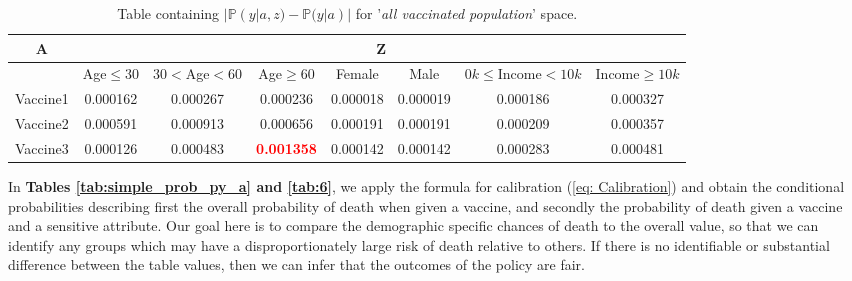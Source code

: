 \documentclass{article}
\begin{document}
\begin{center}
\begin{table}[H]
\begin{adjustbox}{max width=\textwidth}
    \begin{tabular}{ |c| c c c c c c c|}
        \hline
          A  & \multicolumn{7}{c|}{Z} \\
          \hline
          & Age$\leq30$ &    $30<$Age$<60$ &     Age$\geq60$ &    Female &      Male &   $0k\leq$Income$<10k$ &    Income$\geq10k$  \\
        \hline
        Vaccine1 &  0.000162 &  0.000267 &  0.000236 &  0.000018 &  0.000019 &  0.000186 &  0.000327 \\
        Vaccine2 &  0.000591 &  0.000913 &  0.000656 &  0.000191 &  0.000191 &  0.000209 &  0.000357 \\
        Vaccine3 &  0.000126 &  0.000483 &  \textbf{\textcolor{red}{0.001358}} &  0.000142 &  0.000142 &  0.000283 &  0.000481
         \\ \hline
    \end{tabular}
    \end{adjustbox}
    \caption{Table containing $| \mathbb{P}(y | a, z) - \mathbb{P}(y | a) |$ for '\textit{all vaccinated population}' space.}
    \label{tab:diff}
\end{table}
\end{center}

In \textbf{Tables \ref{tab:simple_prob_py_a} and \ref{tab:6}}, we apply the formula for calibration (\ref{eq: Calibration}) and obtain the conditional probabilities describing first the overall probability of death when given a vaccine, and secondly the probability of death given a vaccine and a sensitive attribute. Our goal here is to compare the demographic specific chances of death to the overall value, so that we can identify any groups which may have a disproportionately large risk of death relative to others. If there is no identifiable or substantial difference between the table values, then we can infer that the outcomes of the policy are fair.
\end{document}
